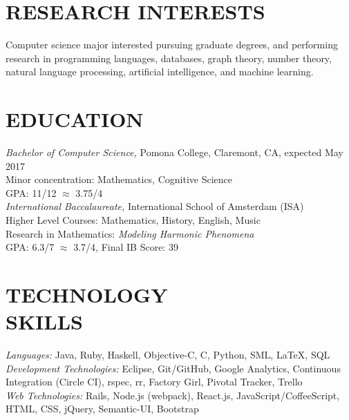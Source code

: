 \documentclass[margin, 10pt]{res} %
\begin{document}
\begin{resume}

 
\section{RESEARCH INTERESTS}
Computer science major interested pursuing graduate degrees, and performing research in programming languages, databases, graph theory, number theory, natural language processing, artificial intelligence, and machine learning.

\vspace{-.5em}
\section{EDUCATION}

{\sl Bachelor of Computer Science,} 
Pomona College, Claremont, CA, expected May 2017 \\
Minor concentration: Mathematics, Cognitive Science \\
GPA: 11/12 $\approx$ 3.75/4 \\[0.2cm]
{\sl International Baccalaureate,}
International School of Amsterdam (ISA)\\
Higher Level Courses: Mathematics, History, English, Music \\
Research in Mathematics: \textit{Modeling Harmonic Phenomena} \\
GPA: 6.3/7 $\approx$ 3.7/4, Final IB Score: 39
 
\vspace{-0.3em}
\section{TECHNOLOGY \\ SKILLS} 

{\sl Languages:} Java, Ruby, Haskell, Objective-C, C, Python, SML,  \LaTeX , SQL \\
{\sl Development Technologies:} Eclipse, Git/GitHub, Google Analytics, Continuous Integration (Circle CI), rspec, rr, Factory Girl, Pivotal Tracker, Trello \\
{\sl Web Technologies:} Rails, Node.js (webpack), React.js,  JavaScript/CoffeeScript, HTML, CSS, jQuery, Semantic-UI, Bootstrap 
\vspace{-0.5em}

\end{resume}
\end{document}
